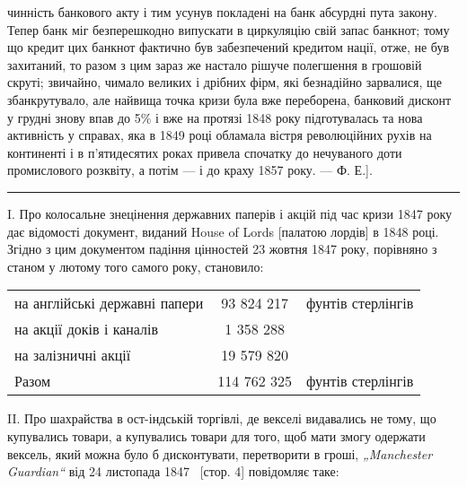 \parcont{}  %
чинність банкового акту і тим усунув покладені на банк абсурдні пута закону. Тепер банк міг
безперешкодно випускати
в циркуляцію свій запас банкнот; тому що кредит цих банкнот
фактично був забезпечений кредитом нації, отже, не був захитаний, то разом з цим зараз же настало
рішуче полегшення
в грошовій скруті; звичайно, чимало великих і дрібних фірм,
які безнадійно зарвалися, ще збанкрутувало, але найвища точка
кризи була вже переборена, банковий дисконт у грудні знову
впав до 5\% і вже на протязі 1848 року підготувалась та нова
активність у справах, яка в 1849 році обламала вістря революційних рухів на континенті і в
п’ятидесятих роках привела спочатку до нечуваного доти промислового розквіту, а потім — і до
краху 1857 року. — Ф. Е.].

\pfbreak

I. Про колосальне знецінення державних паперів і акцій під час кризи
1847 року дає відомості документ, виданий House of Lords [палатою лордів]
в 1848 році. Згідно з цим документом падіння цінностей 23 жовтня 1847 року,
порівняно з станом у лютому того самого року, становило:
\begin{center}
\begin{tabular} {l c c}

на англійські державні папери & \phantom{0}93 824 217 & фунтів стерлінгів\\

на акції доків і каналів & \phantom{00}1 358 288 & \\

на залізничні акції & \phantom{0}19 579 820 & \\
\midrule
Разом & 114 762 325 & фунтів стерлінгів \\
\end{tabular}
\end{center}
II. Про шахрайства в ост-індській торгівлі, де векселі видавались не тому,
що купувались товари, а купувались товари для того, щоб мати змогу одержати вексель, який можна було
б дисконтувати, перетворити в гроші, \emph{„Manchester Guardian“} від 24 листопада 1847~ [стор. 4]
повідомляє таке:

